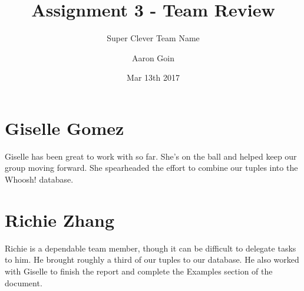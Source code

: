 \documentclass[12pt, oneside]{scrreprt}
\title{Assignment 3 - Team Review}
\subtitle{Super Clever Team Name}
\author{Aaron Goin}
\date{Mar 13th 2017}
\begin{document}
\maketitle

\pagebreak

\section*{Giselle Gomez}
Giselle has been great to work with so far. She's on the ball and helped keep our group moving forward. She spearheaded the effort to combine our tuples into the Whoosh! database.

\section*{Richie Zhang}
Richie is a dependable team member, though it can be difficult to delegate tasks to him. He brought roughly a third of our tuples to our database. He also worked with Giselle to finish the report and complete the Examples section of the document.
\end{document}
